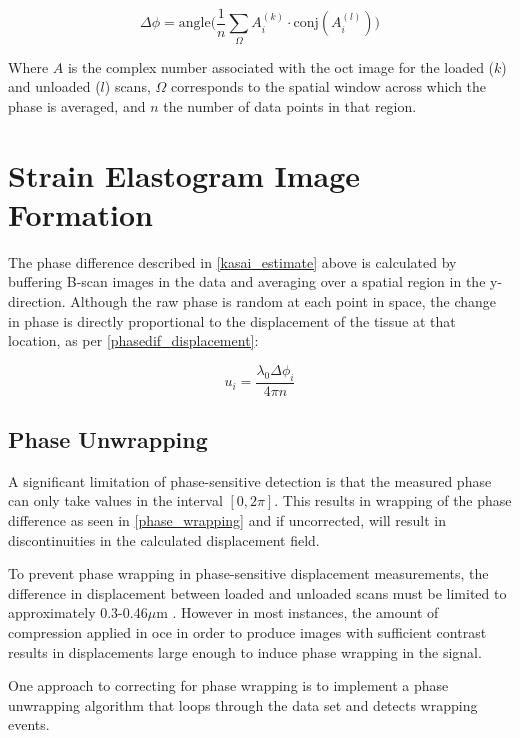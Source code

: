 \begin{equation}
	\Delta\phi = \text{angle}\bigg( \frac{1}{n} \sum_\Omega A_i^{(k)} \cdot \text{conj}(A_i^{(l)}) \bigg)
	\label{kasai_estimate}
\end{equation}

Where $A$ is the complex number associated with the \ac{oct} image for the loaded ($k$) and unloaded ($l$) scans, $\Omega$ corresponds to the spatial window across which the phase is averaged, and $n$ the number of data points in that region.

\section{Strain Elastogram Image Formation}

The phase difference described in \autoref{kasai_estimate} above is calculated by buffering B-scan images in the data and averaging over a spatial region in the y-direction. Although the raw phase is random at each point in space, the change in phase is directly proportional to the displacement of the tissue at that location, as per \autoref{phasedif_displacement}:

\begin{equation}
	u_i = \frac{\lambda_0 \Delta\phi_i}{4\pi n}
	\label{phasedif_displacement}
\end{equation}

\subsection{Phase Unwrapping}

A significant limitation of phase-sensitive detection is that the measured phase can only take values in the interval $[0,2\pi]$. This results in wrapping of the phase difference as seen in \autoref{phase_wrapping} and if uncorrected, will result in discontinuities in the calculated displacement field.

To prevent phase wrapping in phase-sensitive displacement measurements, the difference in displacement between loaded and unloaded scans must be limited to approximately 0.3-0.46$\mu$m \cite{kennedy_optical_2014}. However in most instances, the amount of compression applied in \ac{oce} in order to produce images with sufficient contrast results in displacements large enough to induce phase wrapping in the signal. 

One approach to correcting for phase wrapping is to implement a phase unwrapping algorithm that loops through the data set and detects wrapping events. 

